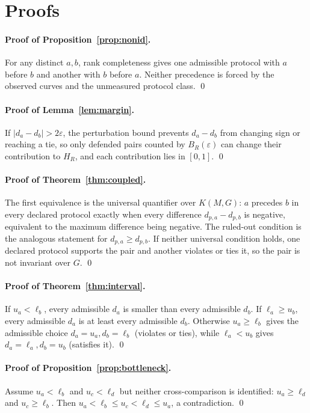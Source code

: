 \documentclass[11pt]{article}
\begin{document}
\appendix

\section{Proofs}
\label{app:proofs}

\paragraph{Proof of Proposition~\ref{prop:nonid}.} For any distinct $a,b$, rank completeness gives one admissible protocol with $a$ before $b$ and another with $b$ before $a$. Neither precedence is forced by the observed curves and the unmeasured protocol class. \qed

\paragraph{Proof of Lemma~\ref{lem:margin}.} If $|d_a-d_b|>2\varepsilon$, the perturbation bound prevents $d_a-d_b$ from changing sign or reaching a tie, so only defended pairs counted by $B_R(\varepsilon)$ can change their contribution to $H_R$, and each contribution lies in $[0,1]$. \qed

\paragraph{Proof of Theorem~\ref{thm:coupled}.} The first equivalence is the universal quantifier over $K(M,G)$: $a$ precedes $b$ in every declared protocol exactly when every difference $d_{p,a}-d_{p,b}$ is negative, equivalent to the maximum difference being negative. The ruled-out condition is the analogous statement for $d_{p,a}\ge d_{p,b}$. If neither universal condition holds, one declared protocol supports the pair and another violates or ties it, so the pair is not invariant over $G$. \qed

\paragraph{Proof of Theorem~\ref{thm:interval}.} If $u_a<\ell_b$, every admissible $d_a$ is smaller than every admissible $d_b$. If $\ell_a\ge u_b$, every admissible $d_a$ is at least every admissible $d_b$. Otherwise $u_a\ge\ell_b$ gives the admissible choice $d_a=u_a,d_b=\ell_b$ (violates or ties), while $\ell_a<u_b$ gives $d_a=\ell_a,d_b=u_b$ (satisfies it). \qed

\paragraph{Proof of Proposition~\ref{prop:bottleneck}.} Assume $u_a<\ell_b$ and $u_c<\ell_d$ but neither cross-comparison is identified: $u_a\ge\ell_d$ and $u_c\ge\ell_b$. Then $u_a<\ell_b\le u_c<\ell_d\le u_a$, a contradiction. \qed
\end{document}
